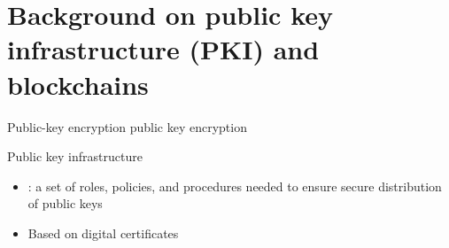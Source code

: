 \section[PKI and blockchains]{Background on public key infrastructure (PKI) and blockchains}


\begin{frame}{Public-key encryption}
public key encryption
\end{frame}

\begin{frame}{Public key infrastructure}

\begin{itemize}
\item {}: a set of roles, policies, and procedures needed to
ensure
secure distribution of public keys
\item Based on digital certificates
\end{itemize}



%

\end{frame}


